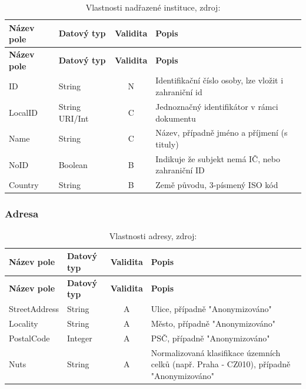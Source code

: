 \begin{center}
\begin{longtable}{lp{20mm}cp{65mm}}
\label{grid_mlmmh} \\
\multicolumn{1}{l}{\textbf{Název pole}} & 
\multicolumn{1}{l}{\textbf{Datový typ}} & 
\multicolumn{1}{l}{\textbf{Validita}} & 
\multicolumn{1}{l}{\textbf{Popis}} \\ \hline 
\endfirsthead
\multicolumn{1}{l}{\textbf{Název pole}} & 
\multicolumn{1}{l}{\textbf{Datový typ}} & 
\multicolumn{1}{l}{\textbf{Validita}} & 
\multicolumn{1}{l}{\textbf{Popis}} \\ \hline 
\hline
\endhead
\endfoot
\caption[Vlastnosti nadřazené instituce]{Vlastnosti nadřazené instituce, zdroj:\cite{metodika, standard}}
\endlastfoot
ID & String & N & Identifikační číslo osoby, lze vložit i zahraniční id \\
\rowcolor{validateC}LocalID & String URI/Int & C & Jednoznačný identifikátor v rámci dokumentu \\
\rowcolor{validateC}Name & String & C & Název, případně jméno a příjmení (s tituly) \\
\rowcolor{validateB}NoID & Boolean & B & Indikuje že subjekt nemá IČ, nebo zahraniční ID \\
\rowcolor{validateB}Country & String & B & Země původu, 3-písmený ISO kód \\
\end{longtable}
\end{center}

\newpage

\subsubsection*{Adresa}

\begin{center}
\begin{longtable}{lp{20mm}cp{65mm}}
\label{grid_mlmmh} \\
\multicolumn{1}{l}{\textbf{Název pole}} & 
\multicolumn{1}{l}{\textbf{Datový typ}} & 
\multicolumn{1}{l}{\textbf{Validita}} & 
\multicolumn{1}{l}{\textbf{Popis}} \\ \hline 
\endfirsthead
\multicolumn{1}{l}{\textbf{Název pole}} & 
\multicolumn{1}{l}{\textbf{Datový typ}} & 
\multicolumn{1}{l}{\textbf{Validita}} & 
\multicolumn{1}{l}{\textbf{Popis}} \\ \hline 
\hline
\endhead
\endfoot
\caption[Vlastnosti adresy]{Vlastnosti adresy, zdroj:\cite{metodika, standard}}
\endlastfoot
\rowcolor{validateA}StreetAddress & String & A & Ulice, případně "Anonymizováno" \\
\rowcolor{validateA}Locality & String & A & Město, případně "Anonymizováno" \\
\rowcolor{validateA}PostalCode & Integer & A & PSČ, případně "Anonymizováno" \\
\rowcolor{validateA}Nuts & String & A & Normalizovaná klasifikace územních celků (např. Praha - CZ010), případně "Anonymizováno" \\
\end{longtable}
\end{center}

